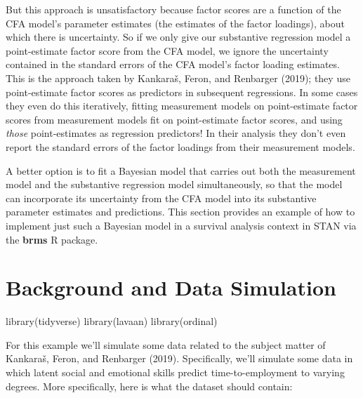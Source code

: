 \documentclass[
  letterpaper,
  DIV=11,
  numbers=noendperiod]{scrreprt}
\newenvironment{Shaded}{\begin{snugshade}}{\end{snugshade}}
\newcommand{\FunctionTok}[1]{\textcolor[rgb]{0.28,0.35,0.67}{#1}}
\newcommand{\NormalTok}[1]{\textcolor[rgb]{0.00,0.23,0.31}{#1}}
\begin{document}
But this approach is unsatisfactory because factor scores are a function
of the CFA model's parameter estimates (the estimates of the factor
loadings), about which there is uncertainty. So if we only give our
substantive regression model a point-estimate factor score from the CFA
model, we ignore the uncertainty contained in the standard errors of the
CFA model's factor loading estimates. This is the approach taken by
Kankaraš, Feron, and Renbarger (2019); they use point-estimate factor
scores as predictors in subsequent regressions. In some cases they even
do this iteratively, fitting measurement models on point-estimate factor
scores from measurement models fit on point-estimate factor scores, and
using \emph{those} point-estimates as regression predictors! In their
analysis they don't even report the standard errors of the factor
loadings from their measurement models.

A better option is to fit a Bayesian model that carries out both the
measurement model and the substantive regression model simultaneously,
so that the model can incorporate its uncertainty from the CFA model
into its substantive parameter estimates and predictions. This section
provides an example of how to implement just such a Bayesian model in a
survival analysis context in STAN via the \textbf{brms} R package.

\hypertarget{background-and-data-simulation}{%
\section{Background and Data
Simulation}\label{background-and-data-simulation}}

\begin{Shaded}
\begin{Highlighting}[]
\FunctionTok{library}\NormalTok{(tidyverse)}
\FunctionTok{library}\NormalTok{(lavaan)}
\FunctionTok{library}\NormalTok{(ordinal)}
\end{Highlighting}
\end{Shaded}

For this example we'll simulate some data related to the subject matter
of Kankaraš, Feron, and Renbarger (2019). Specifically, we'll simulate
some data in which latent social and emotional skills predict
time-to-employment to varying degrees. More specifically, here is what
the dataset should contain:
\end{document}
